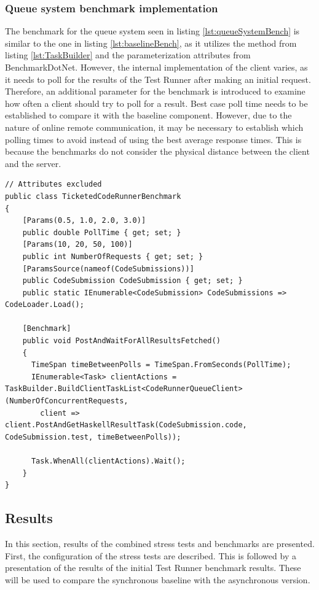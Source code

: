 \subsubsection{Queue system benchmark implementation}
The benchmark for the queue system seen in listing \ref{lst:queueSystemBench} is similar to the one in listing \ref{lst:baselineBench}, as it utilizes the method from listing \ref{lst:TaskBuilder} and the parameterization attributes from BenchmarkDotNet.
However, the internal implementation of the client varies, as it needs to poll for the results of the Test Runner after making an initial request.
Therefore, an additional parameter for the benchmark is introduced to examine how often a client should try to poll for a result.
Best case poll time needs to be established to compare it with the baseline component. 
However, due to the nature of online remote communication, it may be necessary to establish which polling times to avoid instead of using the best average response times.
This is because the benchmarks do not consider the physical distance between the client and the server.
\begin{lstlisting}[language=CSharp, escapechar=~, caption={C\# code showing the benchmark implementation for the asynchronous backend}, label={lst:queueSystemBench}]
// Attributes excluded
public class TicketedCodeRunnerBenchmark
{
    [Params(0.5, 1.0, 2.0, 3.0)] 
    public double PollTime { get; set; }
    [Params(10, 20, 50, 100)] 
    public int NumberOfRequests { get; set; }
    [ParamsSource(nameof(CodeSubmissions))] 
    public CodeSubmission CodeSubmission { get; set; }
    public static IEnumerable<CodeSubmission> CodeSubmissions => CodeLoader.Load();

    [Benchmark]
    public void PostAndWaitForAllResultsFetched()
    {
      TimeSpan timeBetweenPolls = TimeSpan.FromSeconds(PollTime);
      IEnumerable<Task> clientActions = TaskBuilder.BuildClientTaskList<CodeRunnerQueueClient>(NumberOfConcurrentRequests, 
        client => client.PostAndGetHaskellResultTask(CodeSubmission.code, CodeSubmission.test, timeBetweenPolls));

      Task.WhenAll(clientActions).Wait();
    }
}
\end{lstlisting}

\subsection{Results}
In this section, results of the combined stress tests and benchmarks are presented.
First, the configuration of the stress tests are described.
This is followed by a presentation of the results of the initial Test Runner benchmark results.
These will be used to compare the synchronous baseline with the asynchronous version.

